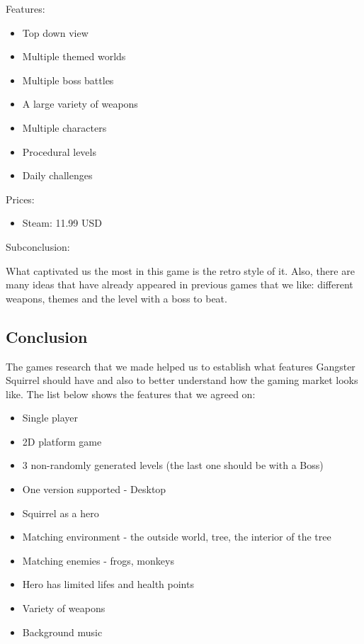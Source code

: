 \documentclass[12p]{article}
\begin{document}
Features:

\begin{itemize}
  \item Top down view
  \item Multiple themed worlds
  \item Multiple boss battles
  \item A large variety of weapons
  \item Multiple characters
  \item Procedural levels
  \item Daily challenges
\end{itemize}

Prices:

\begin{itemize}
  \item Steam: 11.99 USD
\end{itemize}

Subconclusion:

What captivated us the most in this game is the retro style of it. Also, there are many ideas that have already appeared in previous games that we like: different weapons, themes and the level with a boss to beat.


\newpage
\subsection{Conclusion}

The games research that we made helped us to establish what features Gangster Squirrel should have and also to better understand how the gaming market looks like. The list below shows the features that we agreed on:

\begin{itemize}
    \item Single player
    \item 2D platform game
    \item 3 non-randomly generated levels (the last one should be with a Boss)
    \item One version supported - Desktop
    \item Squirrel as a hero
    \item Matching environment - the outside world, tree, the interior of the tree
    \item Matching enemies - frogs, monkeys
    \item Hero has limited lifes and health points 
    \item Variety of weapons
    \item Background music
\end{itemize}
\end{document}
